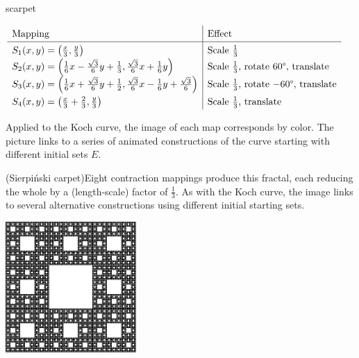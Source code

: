 \begin{examples}{}{scarpet}
\begin{enumerate}
	$\renewcommand\arraystretch{1.4}
	\begin{array}{l|l}
		\text{Mapping}&\text{Effect}\\\hline
		\displaystyle S_1(x,y)=\left(\tfrac x3,\tfrac y3\right)
		&
		\text{Scale $\frac 13$}
		\\
		\displaystyle S_2(x,y)=\left(\tfrac 16x-\tfrac{\sqrt 3}6y+\tfrac 13,\tfrac{\sqrt 3}6x+\tfrac 16y\right)
		&
		\text{Scale $\frac 13$, rotate \ang{60}, translate}
		\\
		\displaystyle S_3(x,y)=\left(\tfrac 16x+\tfrac{\sqrt 3}6y+\tfrac 12,\tfrac{\sqrt 3}6x-\tfrac 16y+\tfrac{\sqrt 3}6\right)
		&
		\text{Scale $\frac 13$, rotate $-\ang{60}$, translate}
		\\
		\displaystyle S_4(x,y)=\left(\tfrac x3+\tfrac 23,\tfrac y3\right)
		&
		\text{Scale $\frac 13$, translate}
	\end{array}$\par
	Applied to the Koch curve, the image of each map corresponds by color. The picture links to a series of animated constructions of the curve starting with different initial sets $E$.
	
	\begin{minipage}[t]{0.72\linewidth}\vspace{0pt}
		\item (Sierpiński carpet)\lstsp Eight contraction mappings produce this fractal, each reducing the whole by a (length-scale) factor of $\frac 13$.\smallbreak
		As with the Koch curve, the image links to several alternative constructions using different initial starting sets.
	\end{minipage}
	\hfill
	\begin{minipage}[t]{0.27\linewidth}\vspace{0pt}
		\flushright \href{http://www.math.uci.edu/~ndonalds/math161/sier-anim.html}{\includegraphics[scale=1]{sieranim2}}
	\end{minipage}\par
	

\end{enumerate}
\end{examples}
